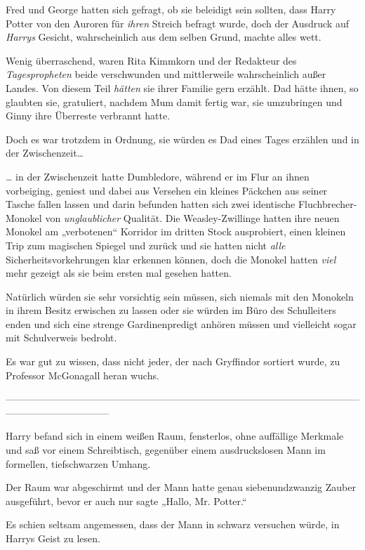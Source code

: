 {Fred und George hatten sich gefragt, ob sie beleidigt sein sollten, dass Harry Potter von den Auroren für \emph{ihren} Streich befragt wurde, doch der Ausdruck auf \emph{Harrys} Gesicht, wahrscheinlich aus dem selben Grund, machte alles wett.

Wenig überraschend, waren Rita Kimmkorn und der Redakteur des \emph{Tagespropheten} beide verschwunden und mittlerweile wahrscheinlich außer Landes. Von diesem Teil \emph{hätten} sie ihrer Familie gern erzählt. Dad hätte ihnen, so glaubten sie, gratuliert, nachdem Mum damit fertig war, sie umzubringen und Ginny ihre Überreste verbrannt hatte.

Doch es war trotzdem in Ordnung, sie würden es Dad eines Tages erzählen und in der Zwischenzeit…

… in der Zwischenzeit hatte Dumbledore, während er im Flur an ihnen vorbeiging, geniest und dabei aus Versehen ein kleines Päckchen aus seiner Tasche fallen lassen und darin befunden hatten sich zwei identische Fluchbrecher-Monokel von \emph{unglaublicher} Qualität. Die Weasley-Zwillinge hatten ihre neuen Monokel am „verbotenen“ Korridor im dritten Stock ausprobiert, einen kleinen Trip zum magischen Spiegel und zurück und sie hatten nicht \emph{alle} Sicherheitsvorkehrungen klar erkennen können, doch die Monokel hatten \emph{viel} mehr gezeigt als sie beim ersten mal gesehen hatten.

Natürlich würden sie sehr vorsichtig sein müssen, sich niemals mit den Monokeln in ihrem Besitz erwischen zu lassen oder sie würden im Büro des Schulleiters enden und sich eine strenge Gardinenpredigt anhören müssen und vielleicht sogar mit Schulverweis bedroht.

Es war gut zu wissen, dass nicht jeder, der nach Gryffindor sortiert wurde, zu Professor McGonagall heran wuchs.

--------------------------------------------------------------------------------------------------------------------------------------------

Harry befand sich in einem weißen Raum, fensterlos, ohne auffällige Merkmale und saß vor einem Schreibtisch, gegenüber einem ausdruckslosen Mann im formellen, tiefschwarzen Umhang.

Der Raum war abgeschirmt und der Mann hatte genau siebenundzwanzig Zauber ausgeführt, bevor er auch nur sagte „Hallo, Mr. Potter.“

Es schien seltsam angemessen, dass der Mann in schwarz versuchen würde, in Harrys Geist zu lesen.

}
